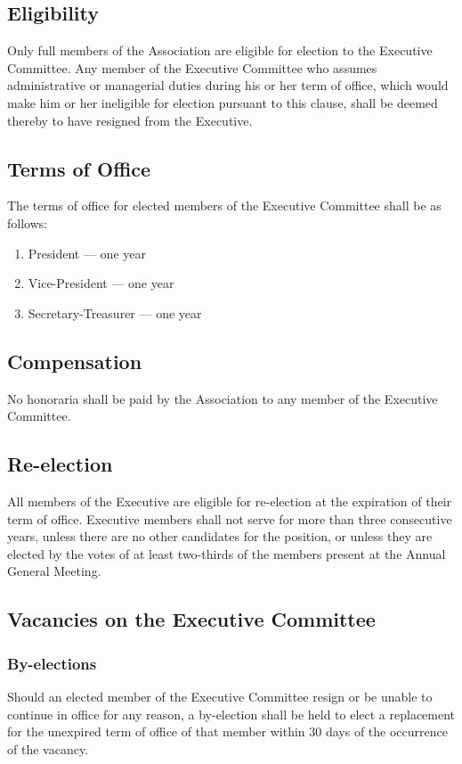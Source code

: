 \documentclass[12pt]{article}
\begin{document}
\subsection{Eligibility}
Only full members of the Association are eligible for election to the Executive Committee. Any member of the Executive Committee who assumes administrative or managerial duties during his or her term of office, which would make him or her ineligible for election pursuant to this clause, shall be deemed thereby to have resigned from the Executive.

\subsection{Terms of Office}
The terms of office for elected members of the Executive Committee shall be as follows:

\begin{enumerate}
\item
President --- one year
\item
Vice-President --- one year
\item
Secretary-Treasurer --- one year
\end{enumerate}

\subsection{Compensation}
No honoraria shall be paid by the Association to any member of the Executive Committee.

\subsection{Re-election}
All members of the Executive are eligible for re-election at the expiration of their term of office. Executive members shall not serve for more than three consecutive years, unless there are no other candidates for the position, or unless they are elected by the votes of at least two-thirds of the members present at the Annual General Meeting.

\subsection{Vacancies on the Executive Committee}

\subsubsection{By-elections}
\label{by-elections}
Should an elected member of the Executive Committee resign or be unable to continue in office for any reason, a by-election shall be held to elect a replacement for the unexpired term of office of that member within 30 days of the occurrence of the vacancy.
\end{document}
